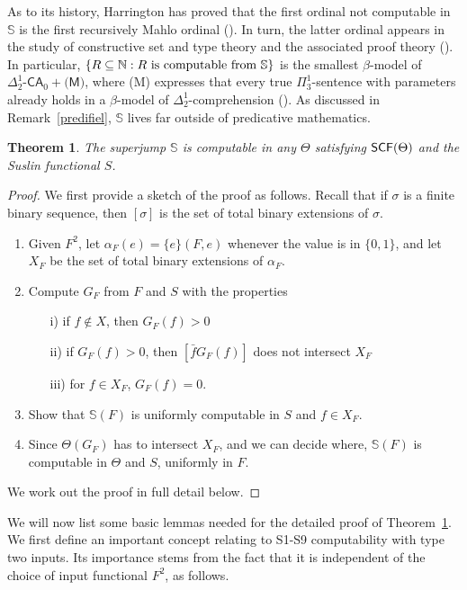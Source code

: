 \documentclass[reqno]{amsart}
\newtheorem{thm}{Theorem}
\def\N{{\mathbb  N}}
\def\SJ{\mathbb{S}}
\def\SCF{\textup{\textsf{SCF}}}
\numberwithin{equation}{section}
\numberwithin{thm}{section}
\begin{document}
As to its history, Harrington has proved that the first ordinal not computable in $\SJ$ is the first recursively Mahlo ordinal (\cite{superharry}).  In turn, the latter ordinal appears in the study of constructive set and type theory and the associated proof theory (\cite{manom, manom2, manom3}).  In particular, $\{R\subseteq \N: R \textup{ is computable from } \SJ\}$ is the smallest $\beta$-model of $\Delta_{2}^{1}\textsf{-CA}_{0}+\textsf{(M)}$, where \textsf{(M)} expresses that every true $\Pi_{3}^{1}$-sentence with parameters already holds in a $\beta$-model of $\Delta_{2}^{1}$-comprehension (\cite{manom}).   
As discussed in Remark~\ref{predifiel}, $\SJ$ lives far outside of predicative mathematics.
\begin{thm}\label{super} %
The superjump $\SJ$ is computable in any $\Theta$ satisfying $\SCF(\Theta)$ and the Suslin functional $S$.
\end{thm}
\begin{proof}
We first provide a sketch of the proof as follows. Recall that if $\sigma$ is a finite binary sequence, then $[\sigma]$ is the set of total binary extensions of $\sigma$.
\begin{enumerate}
\item Given $F^{2}$, let $\alpha_F(e) = \{e\}(F,e)$ whenever the value is in $\{0,1\}$, and let $X_F$ be the set of total binary extensions of $\alpha_F$.
\item Compute $G_F$ from $F$ and $S$ with the properties
\begin{itemize}
\item[i)]  if $f \not \in X$, then  $G_F(f) > 0$
\item[ii)] if $G_F(f) > 0$, then $[\bar fG_F(f)]$ does not intersect $X_F$
\item[iii)] for $f \in X_F$, $G_F(f) = 0$.
\end{itemize} 
\item Show that $\SJ(F)$ is uniformly computable in $S$ and $f \in X_{F}$.
\item Since $\Theta(G_F)$ has to intersect $X_F$, and we can decide where, $\SJ(F)$ is  computable in $\Theta$ and $S$, uniformly in $F$.
\end{enumerate}
We work out the proof in full detail below.
\end{proof}
We will now list some basic lemmas needed for the detailed proof of Theorem~\ref{super}. We first define an important concept relating to S1-S9 computability with type two inputs.   Its importance stems from the fact  that it is independent of the choice of input functional $F^{2}$, as follows.
\end{document}
